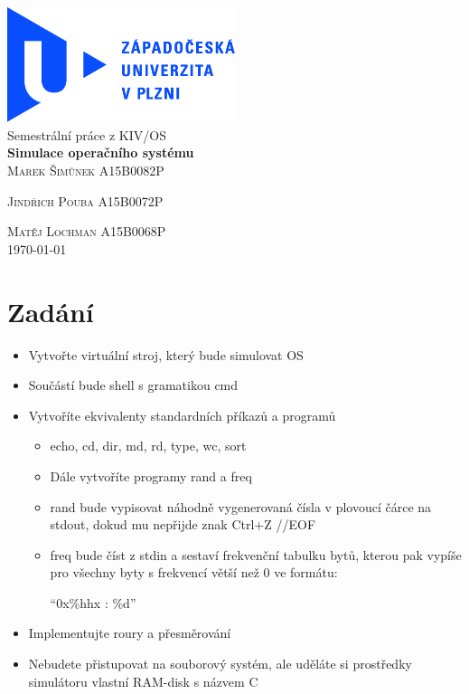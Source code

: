 \documentclass[a4paper]{article}
\begin{document}
\begin{titlepage}

\begin{center}

\author{Marek Šimůnek}

\includegraphics[width=0.5\textwidth]{./logo.jpg} \\[1cm]
 
 \huge Semestrální práce z  KIV/OS \\ [1.5cm]
\huge \textbf{ Simulace operačního systému}\\[0.9cm]
{\Large \textsc{Marek Šimůnek} } {\large \textsc{A15B0082P}  } 

{\Large \textsc{Jindřich Pouba }}{\large \textsc{A15B0072P}  } 

{\Large \textsc{Matěj Lochman }}{\large \textsc{A15B0068P}  } 
\\[0.9cm]




\large \textsc  {\today}



\end{center}


\end{titlepage}

\section{Zadání}
\begin{itemize}
\item Vytvořte virtuální stroj, který bude simulovat OS
\item Součástí bude shell s gramatikou cmd
\item Vytvoříte ekvivalenty standardních příkazů a programů
\begin{itemize}
\item echo, cd, dir, md, rd, type, wc, sort
\item Dále vytvoříte programy rand a freq
\item rand bude vypisovat náhodně vygenerovaná čísla v plovoucí čárce na stdout, dokud mu nepřijde znak Ctrl+Z //EOF
\item freq bude číst z stdin a sestaví frekvenční tabulku bytů, kterou pak vypíše pro všechny byty s frekvencí větší než 0 ve formátu: 

“0x\%hhx : \%d”
\end{itemize}


\item Implementujte roury a přesměrování
\item Nebudete přistupovat na souborový systém, ale uděláte si prostředky simulátoru vlastní RAM-disk s názvem C
\end{itemize}
\end{document}
